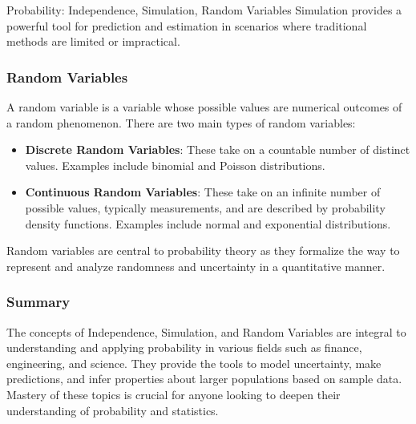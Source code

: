 \begin{notes}{Probability: Independence, Simulation, Random Variables}
    Simulation provides a powerful tool for prediction and estimation in scenarios where traditional methods are limited or impractical.
    
    \subsubsection*{Random Variables}
    
    A random variable is a variable whose possible values are numerical outcomes of a random phenomenon. There are two main types of random variables:
    \begin{itemize}
        \item \textbf{Discrete Random Variables}: These take on a countable number of distinct values. Examples include binomial and Poisson distributions.
        \item \textbf{Continuous Random Variables}: These take on an infinite number of possible values, typically measurements, and are described by probability density functions. Examples include 
        normal and exponential distributions.
    \end{itemize}
    
    Random variables are central to probability theory as they formalize the way to represent and analyze randomness and uncertainty in a quantitative manner.
    
    \subsubsection*{Summary}
    
    The concepts of Independence, Simulation, and Random Variables are integral to understanding and applying probability in various fields such as finance, engineering, and science. They provide the 
    tools to model uncertainty, make predictions, and infer properties about larger populations based on sample data. Mastery of these topics is crucial for anyone looking to deepen their understanding 
    of probability and statistics.    
\end{notes}